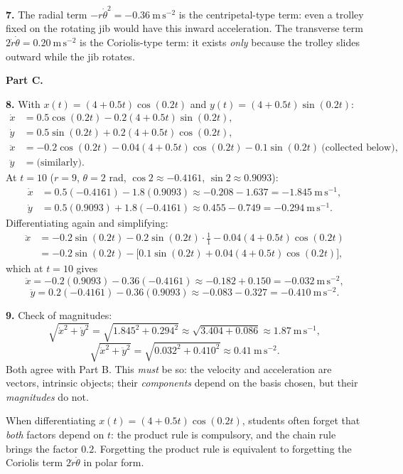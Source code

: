 \documentclass[11pt]{article}
\newcommand{\cle}[1]{{\popxbold\color{popdark}#1}}
\begin{document}
\textbf{7.} The radial term $-r\dot{\theta}^{2} = -0.36\ \mathrm{m\,s^{-2}}$ is the \cle{centripetal-type} term: even a trolley fixed on the rotating jib would have this inward acceleration. The transverse term $2\dot{r}\dot{\theta} = 0.20\ \mathrm{m\,s^{-2}}$ is the \cle{Coriolis-type} term: it exists \emph{only} because the trolley slides outward while the jib rotates.

\textbf{Part C.}

\textbf{8.} With $x(t) = (4 + 0.5t)\cos(0.2t)$ and $y(t) = (4 + 0.5t)\sin(0.2t)$:
\begin{align*}
\dot{x} &= 0.5\cos(0.2t) - 0.2(4 + 0.5t)\sin(0.2t), \\
\dot{y} &= 0.5\sin(0.2t) + 0.2(4 + 0.5t)\cos(0.2t), \\
\ddot{x} &= -0.2\cos(0.2t) - 0.04(4+0.5t)\cos(0.2t) - 0.1\sin(0.2t)\ \text{(collected below)}, \\
\ddot{y} &= \text{(similarly)}.
\end{align*}
At $t = 10$ ($r = 9$, $\theta = 2$ rad, $\cos 2 \approx -0.4161$, $\sin 2 \approx 0.9093$):
\begin{align*}
\dot{x} &= 0.5(-0.4161) - 1.8(0.9093) \approx -0.208 - 1.637 = -1.845\ \mathrm{m\,s^{-1}}, \\
\dot{y} &= 0.5(0.9093) + 1.8(-0.4161) \approx 0.455 - 0.749 = -0.294\ \mathrm{m\,s^{-1}}.
\end{align*}
Differentiating again and simplifying:
\begin{align*}
\ddot{x} &= -0.2\sin(0.2t) - 0.2\sin(0.2t)\cdot\tfrac{1}{1} - 0.04(4+0.5t)\cos(0.2t) \\
&= -0.2\sin(0.2t) - \big[0.1\sin(0.2t) + 0.04(4+0.5t)\cos(0.2t)\big],
\end{align*}
which at $t = 10$ gives
\[ \ddot{x} = -0.2(0.9093) - 0.36(-0.4161) \approx -0.182 + 0.150 = -0.032\ \mathrm{m\,s^{-2}}, \]
\[ \ddot{y} = 0.2(-0.4161) - 0.36(0.9093) \approx -0.083 - 0.327 = -0.410\ \mathrm{m\,s^{-2}}. \]

\textbf{9.} Check of magnitudes:
\[ \sqrt{\dot{x}^{2} + \dot{y}^{2}} = \sqrt{1.845^{2} + 0.294^{2}} \approx \sqrt{3.404 + 0.086} \approx 1.87\ \mathrm{m\,s^{-1}}, \]
\[ \sqrt{\ddot{x}^{2} + \ddot{y}^{2}} = \sqrt{0.032^{2} + 0.410^{2}} \approx 0.41\ \mathrm{m\,s^{-2}}. \]
Both agree with Part B. This \emph{must} be so: the velocity and acceleration are \cle{vectors}, intrinsic objects; their \emph{components} depend on the basis chosen, but their \emph{magnitudes} do not.

\begin{attention}
When differentiating $x(t) = (4 + 0.5t)\cos(0.2t)$, students often forget that \emph{both} factors depend on $t$: the product rule is compulsory, and the chain rule brings the factor $0.2$. Forgetting the product rule is equivalent to forgetting the Coriolis term $2\dot{r}\dot{\theta}$ in polar form.
\end{attention}
\end{document}
